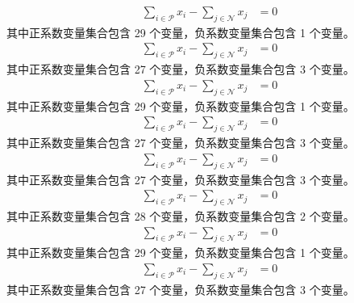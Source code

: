 \documentclass[a4paper,11pt]{article}
\begin{document}
\begin{align}
\sum_{i \in \mathcal{P}} x_i - \sum_{j \in \mathcal{N}} x_j &= 0 \nonumber
\end{align}
其中正系数变量集合包含 29 个变量，负系数变量集合包含 1 个变量。\\[0.3em]

\begin{align}
\sum_{i \in \mathcal{P}} x_i - \sum_{j \in \mathcal{N}} x_j &= 0 \nonumber
\end{align}
其中正系数变量集合包含 27 个变量，负系数变量集合包含 3 个变量。\\[0.3em]

\begin{align}
\sum_{i \in \mathcal{P}} x_i - \sum_{j \in \mathcal{N}} x_j &= 0 \nonumber
\end{align}
其中正系数变量集合包含 29 个变量，负系数变量集合包含 1 个变量。\\[0.3em]

\begin{align}
\sum_{i \in \mathcal{P}} x_i - \sum_{j \in \mathcal{N}} x_j &= 0 \nonumber
\end{align}
其中正系数变量集合包含 27 个变量，负系数变量集合包含 3 个变量。\\[0.3em]

\begin{align}
\sum_{i \in \mathcal{P}} x_i - \sum_{j \in \mathcal{N}} x_j &= 0 \nonumber
\end{align}
其中正系数变量集合包含 27 个变量，负系数变量集合包含 3 个变量。\\[0.3em]

\begin{align}
\sum_{i \in \mathcal{P}} x_i - \sum_{j \in \mathcal{N}} x_j &= 0 \nonumber
\end{align}
其中正系数变量集合包含 28 个变量，负系数变量集合包含 2 个变量。\\[0.3em]

\begin{align}
\sum_{i \in \mathcal{P}} x_i - \sum_{j \in \mathcal{N}} x_j &= 0 \nonumber
\end{align}
其中正系数变量集合包含 29 个变量，负系数变量集合包含 1 个变量。\\[0.3em]

\begin{align}
\sum_{i \in \mathcal{P}} x_i - \sum_{j \in \mathcal{N}} x_j &= 0 \nonumber
\end{align}
其中正系数变量集合包含 27 个变量，负系数变量集合包含 3 个变量。\\[0.3em]
\end{document}
